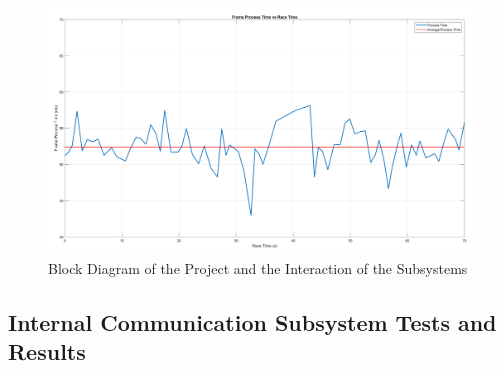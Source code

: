 \documentclass[a4paper,12pt]{article}
\begin{document}
\begin{enumerate}
	\begin{figure}[h]
		\includegraphics[width=\textwidth,center]{images/ROT_ROI/ProcessTime_crop}
		\caption{Block Diagram of the Project and the Interaction of the Subsystems}\label{fig:blockdiagram}
	\end{figure}

\end{enumerate}



\subsection {Internal Communication Subsystem Tests and Results}
\end{document}
